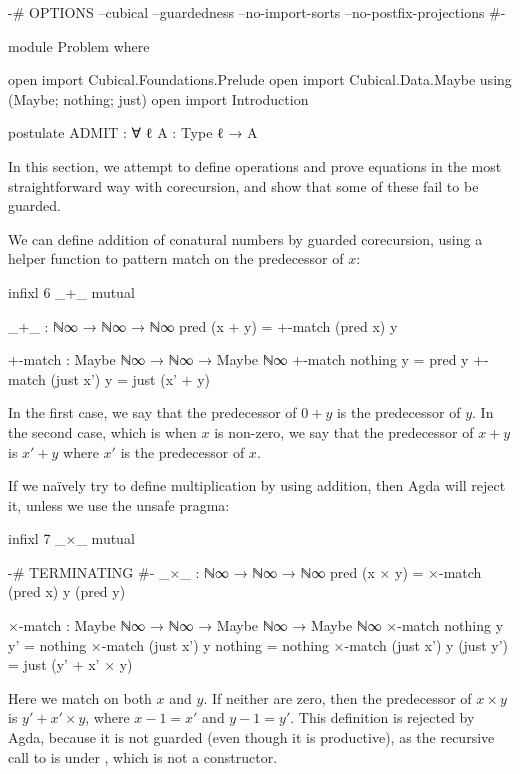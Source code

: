 \begin{code}[hide]
{-# OPTIONS --cubical --guardedness --no-import-sorts --no-postfix-projections #-}

module Problem where

open import Cubical.Foundations.Prelude
open import Cubical.Data.Maybe using (Maybe; nothing; just)
open import Introduction

postulate
  ADMIT : ∀ {ℓ} {A : Type ℓ} → A
\end{code}
In this section, we attempt to define operations and prove equations in the most
straightforward way with corecursion, and show that some of these fail to be
guarded.

We can define addition of conatural numbers by guarded corecursion, using a
helper function  to pattern match on the predecessor of
$x$:
\begin{code}[hide]
infixl 6 _+_
mutual
\end{code}
\begin{code}
  _+_ : ℕ∞ → ℕ∞ → ℕ∞
  pred (x + y) = +-match (pred x) y

  +-match : Maybe ℕ∞ → ℕ∞ → Maybe ℕ∞
  +-match nothing    y = pred y
  +-match (just x')  y = just (x' + y)
\end{code}
In the first case, we say that the predecessor of $0 + y$ is the predecessor of
$y$. In the second case, which is when $x$ is non-zero, we say that the
predecessor of $x + y$ is $x' + y$ where $x'$ is the predecessor of $x$.

If we naïvely try to define multiplication by using addition, then Agda will
reject it, unless we use the unsafe  pragma:
\begin{code}[hide]
infixl 7 _×_
mutual
\end{code}
\begin{code}
  {-# TERMINATING #-}
  _×_ : ℕ∞ → ℕ∞ → ℕ∞
  pred (x × y) = ×-match (pred x) y (pred y)

  ×-match :
    Maybe ℕ∞ → ℕ∞ → Maybe ℕ∞ → Maybe ℕ∞
  ×-match nothing    y y'         = nothing
  ×-match (just x')  y nothing    = nothing
  ×-match (just x')  y (just y')  = just (y' + x' × y)
\end{code}
Here we match on both $x$ and $y$. If neither are zero, then the predecessor of
$x × y$ is $y' + x' × y$, where $x - 1 = x'$ and $y - 1 = y'$. This definition
is rejected by Agda, because it is not guarded (even though it is productive),
as the recursive call to  is under \AgdaFunction{\_+\_},
which is not a constructor.

